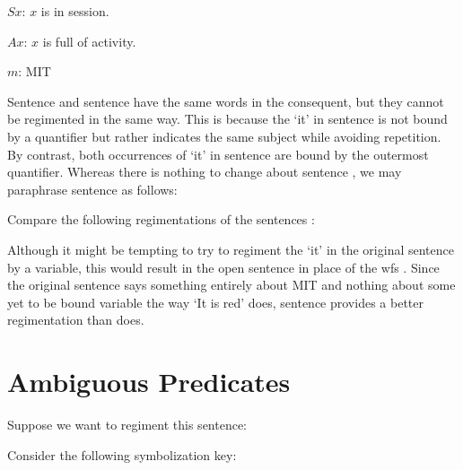 \begin{ekey}
  \item[$Sx$:] $x$ is in session.
  \item[$Ax$:] $x$ is full of activity.
  \item[$m$:] MIT
\end{ekey}

Sentence  and sentence  have the same words in the consequent, but they cannot be regimented in the same way.
This is because the `it' in sentence  is not bound by a quantifier but rather indicates the same subject while avoiding repetition.
By contrast, both occurrences of `it' in sentence  are bound by the outermost quantifier.
Whereas there is nothing to change about sentence , we may paraphrase sentence  as follows:

\begin{earg} \label{propara}
\end{earg}

Compare the following regimentations of the sentences :

\begin{earg} \label{proreg}
\end{earg}

Although it might be tempting to try to regiment the `it' in the original sentence  by a variable, this would result in the open sentence  in place of the wfs .
Since the original sentence says something entirely about MIT and nothing about some yet to be bound variable the way `It is red' does, sentence  provides a better regimentation than  does.





\section{Ambiguous Predicates}

Suppose we want to regiment this sentence:

\begin{earg} \label{amb1}
\end{earg}

Consider the following symbolization key:

